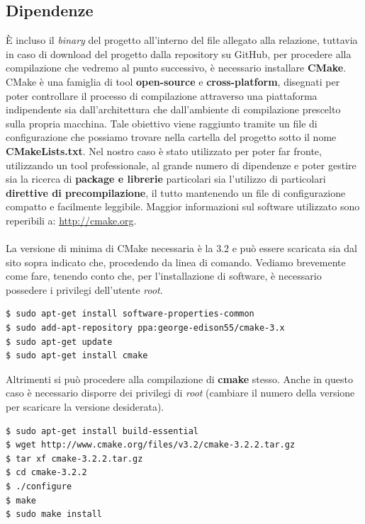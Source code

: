 \documentclass[italian]{tktltiki2}
\begin{document}
\subsection{Dipendenze}
È incluso il \emph{binary} del progetto all'interno del file allegato alla relazione, tuttavia in caso di download del progetto dalla repository su GitHub, per procedere alla compilazione che vedremo al punto successivo, è necessario installare \textbf{CMake}.
\\
CMake è una famiglia di tool \textbf{open-source} e \textbf{cross-platform}, disegnati per poter controllare il processo di compilazione attraverso una piattaforma indipendente sia dall'architettura che dall'ambiente di compilazione prescelto sulla propria macchina. Tale obiettivo viene raggiunto tramite un file di configurazione che possiamo trovare nella cartella del progetto sotto il nome \textbf{CMakeLists.txt}. Nel nostro caso è stato utilizzato per poter far fronte, utilizzando un tool professionale, al grande numero di dipendenze e poter gestire sia la ricerca di \textbf{package e librerie} particolari sia l'utilizzo di particolari \textbf{direttive di precompilazione}, il tutto mantenendo un file di configurazione compatto e facilmente leggibile. Maggior informazioni sul software utilizzato sono reperibili a: \url{http://cmake.org}.
\\
\\
La versione di minima di CMake necessaria è la 3.2 e può essere scaricata sia dal sito sopra indicato che, procedendo da linea di comando. Vediamo brevemente come fare, tenendo conto che, per l'installazione di software, è necessario possedere i privilegi dell'utente \emph{root}.
\begin{lstlisting}
$ sudo apt-get install software-properties-common
$ sudo add-apt-repository ppa:george-edison55/cmake-3.x
$ sudo apt-get update
$ sudo apt-get install cmake
\end{lstlisting}
Altrimenti si può procedere alla compilazione di \textbf{cmake} stesso. Anche in questo caso è necessario disporre dei privilegi di \emph{root} (cambiare il numero della versione per scaricare la versione desiderata).
\begin{lstlisting}
$ sudo apt-get install build-essential
$ wget http://www.cmake.org/files/v3.2/cmake-3.2.2.tar.gz
$ tar xf cmake-3.2.2.tar.gz
$ cd cmake-3.2.2
$ ./configure
$ make
$ sudo make install
\end{lstlisting}
\end{document}
